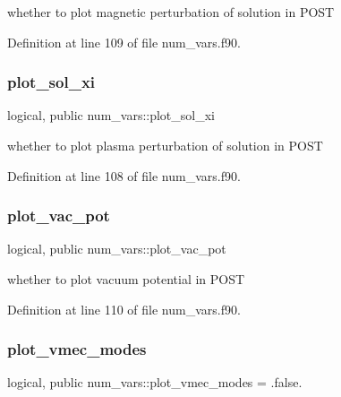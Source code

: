 whether to plot magnetic perturbation of solution in P\+O\+ST 



Definition at line 109 of file num\+\_\+vars.\+f90.

\mbox{\label{namespacenum__vars_aca13a9c68dbf136ed2a2a8e0fa04c087}} 
\subsubsection{\texorpdfstring{plot\+\_\+sol\+\_\+xi}{plot\_sol\_xi}}
{\footnotesize\ttfamily logical, public num\+\_\+vars\+::plot\+\_\+sol\+\_\+xi}



whether to plot plasma perturbation of solution in P\+O\+ST 



Definition at line 108 of file num\+\_\+vars.\+f90.

\mbox{\label{namespacenum__vars_a641ae7ad0ef7673f5a3f6966d311d8cc}} 
\subsubsection{\texorpdfstring{plot\+\_\+vac\+\_\+pot}{plot\_vac\_pot}}
{\footnotesize\ttfamily logical, public num\+\_\+vars\+::plot\+\_\+vac\+\_\+pot}



whether to plot vacuum potential in P\+O\+ST 



Definition at line 110 of file num\+\_\+vars.\+f90.

\mbox{\label{namespacenum__vars_a89067eb4dc3fcdcc85d7cf185d3774ea}} 
\subsubsection{\texorpdfstring{plot\+\_\+vmec\+\_\+modes}{plot\_vmec\_modes}}
{\footnotesize\ttfamily logical, public num\+\_\+vars\+::plot\+\_\+vmec\+\_\+modes = .false.}



